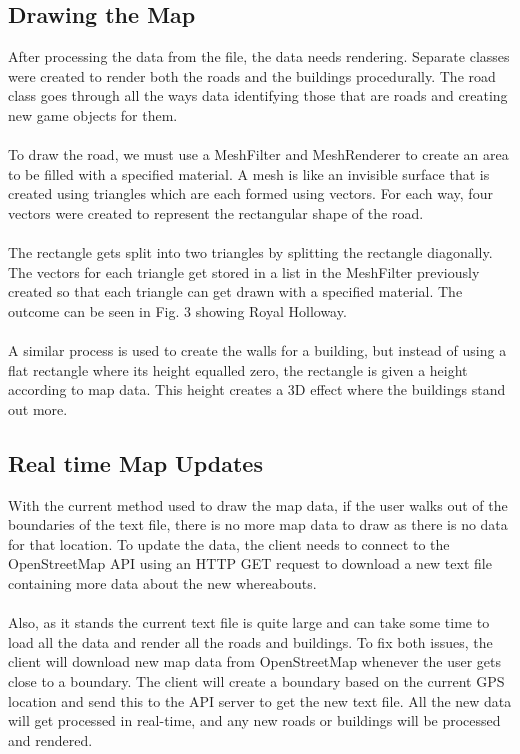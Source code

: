 \documentclass[a4paper]{report}
\begin{document}
\subsection{Drawing the Map}
After processing the data from the file, the data needs rendering. Separate classes were created to render both the roads and the buildings procedurally. The road class goes through all the ways data identifying those that are roads and creating new game objects for them.  
\\\\
To draw the road, we must use a MeshFilter and MeshRenderer to create an area to be filled with a specified material. A mesh is like an invisible surface that is created using triangles which are each formed using vectors. For each way, four vectors were created to represent the rectangular shape of the road.  
\\\\
The rectangle gets split into two triangles by splitting the rectangle diagonally. The vectors for each triangle get stored in a list in the MeshFilter previously created so that each triangle can get drawn with a specified material. The outcome can be seen in Fig. 3 showing Royal Holloway.
\\\\
A similar process is used to create the walls for a building, but instead of using a flat rectangle where its height equalled zero, the rectangle is given a height according to map data. This height creates a 3D effect where the buildings stand out more. 
\subsection{Real time Map Updates}
With the current method used to draw the map data, if the user walks out of the boundaries of the text file, there is no more map data to draw as there is no data for that location. To update the data, the client needs to connect to the OpenStreetMap API using an HTTP GET request to download a new text file containing more data about the new whereabouts.
\\\\
Also, as it stands the current text file is quite large and can take some time to load all the data and render all the roads and buildings. To fix both issues, the client will download new map data from OpenStreetMap whenever the user gets close to a boundary. The client will create a boundary based on the current GPS location and send this to the API server to get the new text file. All the new data will get processed in real-time, and any new roads or buildings will be processed and rendered.
\end{document}

